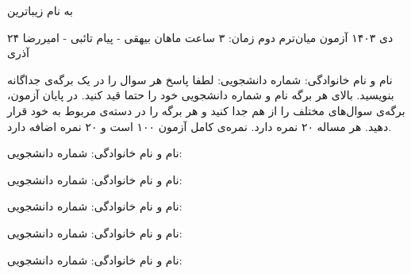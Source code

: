 
\usepackage{assets/template}
\usepackage{tikz}
\newcommand{\hidesolutions}{}


{\centering به نام زیباترین}\\
	\def\ci{\perp\!\!\!\perp}

	\header
		{۲۴ دی ۱۴۰۳}
		{آزمون میان‌ترم دوم}
		{زمان: ۳ ساعت}
		{ماهان بیهقی - پیام تائبی - امیررضا آذری}{}
	
\vspace{-3mm}
نام و نام خانوادگی: \hspace{8cm} شماره دانشجویی:
\hline
\vspace{2mm}
لطفا پاسخ هر سوال را در یک برگه‌ی جداگانه بنویسید. بالای هر برگه نام و شماره‌ دانشجویی خود را حتما قید کنید. در پایان آزمون، برگه‌ی سوال‌های مختلف را از هم جدا کنید و هر برگه را در دسته‌ی مربوط به خود قرار دهید.
هر مساله ۲۰ نمره دارد. نمره‌ی کامل آزمون ۱۰۰ است و  ۲۰ نمره اضافه دارد.

\vspace{0.5cm}

\pagebreak
\hline
نام و نام خانوادگی: \hspace{8cm} شماره دانشجویی:
\hline
\vspace{0.5cm}

\pagebreak
\hline
نام و نام خانوادگی: \hspace{8cm} شماره دانشجویی:
\hline
\vspace{0.5cm}

\pagebreak
\hline
نام و نام خانوادگی: \hspace{8cm} شماره دانشجویی:
\hline
\vspace{0.5cm}

\pagebreak
\hline
نام و نام خانوادگی: \hspace{8cm} شماره دانشجویی:
\hline
\vspace{0.5cm}

\pagebreak
\hline
نام و نام خانوادگی: \hspace{8cm} شماره دانشجویی:
\hline
\vspace{0.5cm}


